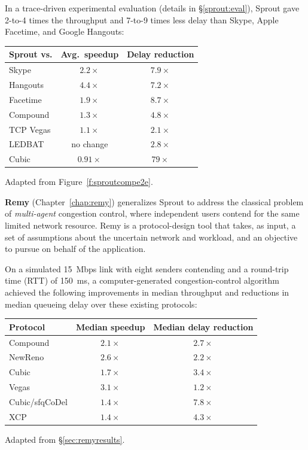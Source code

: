 In a trace-driven experimental evaluation (details in
\S\ref{sprout:eval}), Sprout gave 2-to-4 times the throughput and
7-to-9 times less delay than Skype, Apple Facetime, and Google
Hangouts:

\begin{center}
\noindent \begin{tabular}{|l|c|c|}
\hline
Sprout vs. & Avg.~speedup & Delay reduction \\
\hline
\hline
Skype & $2.2\times$ & $7.9\times$\\
Hangouts & $4.4\times$ & $7.2\times$\\
Facetime & $1.9\times$ & $8.7\times$\\
\hline
Compound & $1.3\times$ & $4.8\times$\\
TCP Vegas & $1.1\times$ & $2.1\times$\\
LEDBAT & no change & $2.8\times$\\
Cubic & \cellcolor{red!20}$0.91\times$ & $79\times$\\
\hline
\end{tabular}

{\footnotesize Adapted from Figure~\ref{f:sproutcompe2e}.}

\end{center}

\textbf{Remy} (Chapter~\ref{chap:remy}) generalizes Sprout to address
the classical problem of \emph{multi-agent} congestion control, where
independent users contend for the same limited network resource. Remy
is a protocol-design tool that takes, as input, a set of assumptions
about the uncertain network and workload, and an objective to pursue
on behalf of the application.

On a simulated 15~Mbps link with eight senders contending and a
round-trip time (RTT) of 150~ms, a computer-generated
congestion-control algorithm achieved the following improvements in
median throughput and reductions in median queueing delay over these
existing protocols:

\begin{center}

\begin{tabular}{|l|c|c|}
\hline
Protocol & Median speedup & Median delay reduction \\
\hline
\hline
Compound & $2.1\times$ & $2.7\times$ \\
NewReno & $2.6\times$ & $2.2\times$ \\
Cubic & $1.7\times$ & $3.4\times$ \\
Vegas & $3.1\times$ & $1.2\times$ \\
\hline
Cubic/sfqCoDel & $1.4\times$ & $7.8\times$ \\
XCP & $1.4\times$ & $4.3\times$ \\
\hline
\end{tabular}

{\footnotesize Adapted from \S\ref{sec:remyresults}.}

\end{center}

